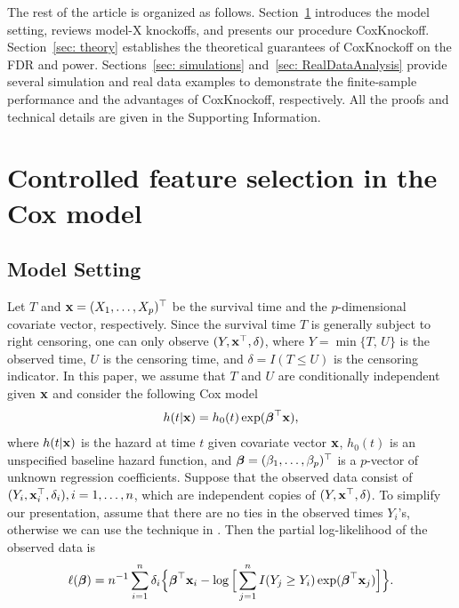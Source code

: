 \documentclass[11pt]{article}
\def\bx{{\bf x}}
\newcommand{\bbeta}{\mbox{\boldmath $\beta$}}
\begin{document}
The rest of the article is organized as follows. Section~\ref{sec: method} introduces the model setting, reviews model-X knockoffs, and presents our procedure CoxKnockoff.  
Section~\ref{sec: theory} establishes the theoretical guarantees of CoxKnockoff on
the FDR and power.
Sections~\ref{sec: simulations} and~\ref{sec: RealDataAnalysis} 
provide several simulation and real
data examples to demonstrate the finite-sample performance and the advantages of 
CoxKnockoff, respectively. 
All the proofs and technical details are given in the Supporting Information.


\section{Controlled feature selection in the Cox model}\label{sec: method}

\subsection{Model Setting}\label{sec: model-setting}
Let $T$ and $\bx = (X_{1}, \ldots, X_{p})^{\top}$ be the survival time and the $p$-dimensional covariate vector, respectively. Since the survival time $T$ is generally subject to right censoring, one can only observe $(Y, \bx^{\top}, \delta)$, where $Y=\min\{T,\, U\}$ is the  observed time, $U$ is the censoring time, and $\delta=I(T\leq U)$ is the censoring indicator. %
In this paper, we assume that $T$ and
$U$ are conditionally independent given $\bx$ and consider the following Cox model%
\begin{align*}%
h(t|\bx) = h_0(t)\exp(\bbeta^{\top}\bx),
\end{align*}
where $h(t|\bx)$ is the hazard at time $t$ given covariate vector $\bx$, 
$h_0(t)$ is an unspecified baseline hazard function, and $\bbeta=(\beta_{1}, \ldots, \beta_{p})^{\top}$ is a $p$-vector of unknown regression coefficients. 
Suppose that the observed data consist of $(Y_i, \bx_i^{\top}, \delta_i), i=1, \ldots, n$, which are independent copies of $(Y, \bx^{\top}, \delta)$.
To simplify our presentation, assume that there are no ties in the observed times $Y_i$'s, otherwise we can use  the technique in \cite{breslow1974covariance}. Then the partial log-likelihood
of the observed data is 
\begin{equation*}%
\ell(\bbeta)
=n^{-1}\sum_{i=1}^{n}\delta_i
\Big\{\bbeta^{\top}\bx_i-\log\Big[\sum\limits_{j=1}^{n}I(Y_j\geq Y_i) \exp(\bbeta^{\top}\bx_j)\Big] \Big\}.
\end{equation*}
\end{document}
